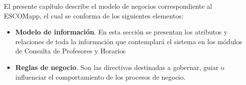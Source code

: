 
El presente capítulo describe el modelo de negocios correspondiente al ESCOMapp, el cual se conforma de los siguientes elementos:

\begin{itemize}
	
    \item \textbf{Modelo de información}. En esta sección se presentan los atributos y relaciones de toda la información que contemplará el sistema en los módulos de Consulta de Profesores y Horarios

    \item \textbf{Reglas de negocio}. Son las directivas destinadas a gobernar, guiar o influenciar el comportamiento de los procesos de negocio.
     
\end{itemize}

